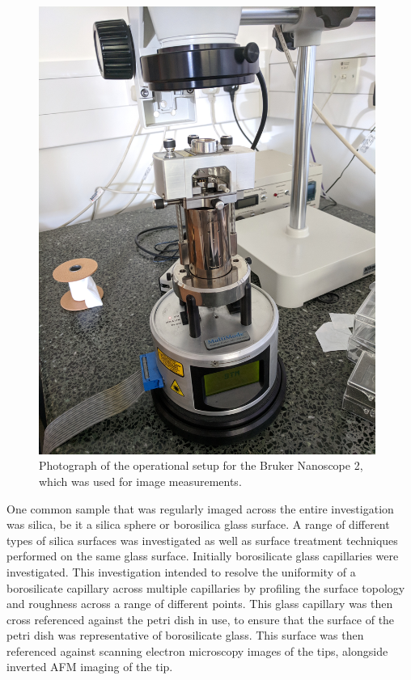 \begin{figure}[h!!!!!!!]     %
        \begin{center}
          \includegraphics[width=110mm]{chapter2/ImageAFM.jpg}
\end{center}
\caption{Photograph of the operational setup for the Bruker Nanoscope 2, which was used for image measurements.}
\label{fig:ImageAFM}                 %
\end{figure}

 One common sample that was regularly imaged across the entire investigation was silica, be it a silica sphere or borosilica glass surface. A range of different types of silica surfaces was investigated as well as surface treatment techniques performed on the same glass surface. Initially borosilicate glass capillaries were investigated. This investigation intended to resolve the uniformity of a borosilicate capillary across multiple capillaries by profiling the surface topology and roughness across a range of different points. This glass capillary was then cross referenced against the petri dish in use, to ensure that the surface of the petri dish was representative of borosilicate glass. This surface was then referenced against scanning electron microscopy images of the tips, alongside inverted AFM imaging of the tip.

